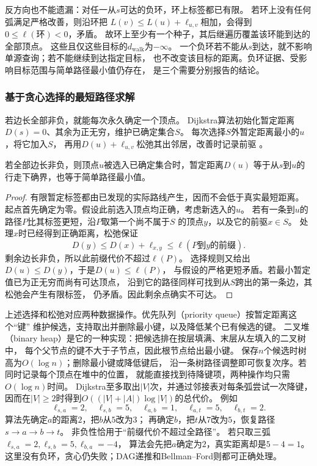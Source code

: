 反方向也不能遗漏：对任一从\(s\)可达的负环，环上标签都已有限。
若环上没有任何弧满足严格改善，则沿环把
\(L(v)\leq L(u)+\ell_{u,v}\)相加，会得到\(0\leq\ell(\text{环})<0\)，矛盾。
故环上至少有一个种子，其后继遍历覆盖该环能到达的全部顶点。
这些且仅这些目标的\(d_{\mathrm{walk}}\)为\(-\infty\)。
一个负环若不能从\(s\)到达，就不影响单源查询；若不能继续到达指定目标，
也不改变该目标的距离。负环证据、受影响目标范围与简单路径最小值仍存在，
是三个需要分别报告的结论。

\subsubsection{基于贪心选择的最短路径求解}

若边长全部非负，就能每次永久确定一个顶点。
Dijkstra算法初始化暂定距离\(D(s)=0\)、其余为正无穷，维护已确定集合\(S\)。
每次选择\(S\)外暂定距离最小的\(u\)，将它加入\(S\)，
再用\(D(u)+\ell_{u,v}\)松弛其出邻居，改善时记录前驱
。

\begin{theorem}[Dijkstra算法的贪心正确性]
  \label{thm:graph-theory-dijkstra-correctness}
  若全部边长非负，则顶点\(u\)被选入已确定集合时，暂定距离\(D(u)\)
  等于从\(s\)到\(u\)的行走下确界，也等于简单路径最小值。
\end{theorem}

\begin{proof}
有限暂定标签都由已发现的实际路线产生，因而不会低于真实最短距离。
起点首先确定为零。假设此前选入顶点均正确，考虑新选入的\(u\)。
若有一条到\(u\)的路径\(P\)比其标签更短，沿\(P\)取第一个尚不属于\(S\)
的顶点\(y\)，以及它的前驱\(x\in S\)。
处理\(x\)时已经得到正确距离，松弛保证
\[
  D(y)\leq D(x)+\ell_{x,y}
  \leq \ell(P\text{到}y\text{的前缀}).
\]
剩余边长非负，所以此前缀代价不超过\(\ell(P)\)。
选择规则又给出\(D(u)\leq D(y)\)，于是\(D(u)\leq\ell(P)\)，
与假设的严格更短矛盾。若最小暂定值已为正无穷而尚有可达顶点，
沿到它的路径同样可找到从\(S\)跨出的第一条边，其松弛会产生有限标签，
仍矛盾。因此剩余点确实不可达。
\end{proof}

上述选择和松弛对应两种数据操作。优先队列（priority queue）按暂定距离这个“键”
维护候选，支持取出并删除最小键，以及降低某个已有候选的键。
二叉堆（binary heap）是它的一种实现：把候选排在按层填满、末层从左填入的二叉树中，
每个父节点的键不大于子节点，因此根节点给出最小键。
保存\(n\)个候选时树高为\(O(\log n)\)；删除最小键或降低键后，
沿一条树路径调整即可恢复次序。若同时记录每个顶点在堆中的位置，
就能直接找到待降键项，两种操作均只需\(O(\log n)\)时间。
Dijkstra至多取出\(|V|\)次，并通过邻接表对每条弧尝试一次降键，
因而在\(|V|\geq2\)时得到\(O((|V|+|A|)\log|V|)\)的总代价。
例如
\[
  \ell_{s,a}=2,\quad\ell_{s,b}=5,\quad\ell_{a,b}=1,\quad
  \ell_{a,t}=5,\quad\ell_{b,t}=2.
\]
算法先确定\(a\)的距离\(2\)，把\(b\)从\(5\)改为\(3\)；
再确定\(b\)，把\(t\)从\(7\)改为\(5\)，恢复路径\(s\to a\to b\to t\)。
非负性恰用于“前缀代价不超过全路径”。
若只取三弧\(\ell_{s,a}=2,\ell_{s,b}=5,\ell_{b,a}=-4\)，
算法会先把\(a\)确定为\(2\)，真实距离却是\(5-4=1\)。
这里没有负环，贪心仍失败；DAG递推和Bellman--Ford则都可正确处理。


